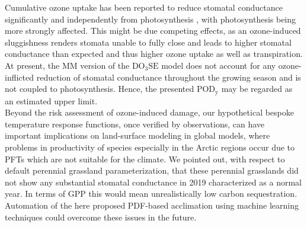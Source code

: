 \documentclass[bg, manuscript]{copernicus}
\begin{document}
Cumulative ozone uptake has been reported to reduce stomatal conductance significantly and independently from photosynthesis \citep[e.g.]{BGS:Lombardozzi2012}, with photosynthesis being more strongly affected. This might be due competing effects, as an ozone-induced sluggishness \citep{SR:Hoshika2015} renders stomata unable to fully close and leads to higher stomatal conductance than expected and thus higher ozone uptake as well as transpiration. At present, the MM version of the $\mathrm{DO_3SE}$ model does not account for any ozone-inflicted reduction of stomatal conductance throughout the growing season and is not coupled to photosynthesis. Hence, the presented $\mathrm{POD_y}$ may be regarded as an estimated upper limit.\\

Beyond the risk assessment of ozone-induced damage, our hypothetical bespoke temperature response functions, once verified by observations, can have important implications on land-surface modeling in global models, where problems in productivity of species especially in the Arctic regions occur due to PFTs which are not suitable for the climate. We pointed out, with respect to default perennial grassland parameterization, that these perennial grasslands did not show any substantial stomatal conductance in 2019 characterized as a normal year. In terms of GPP this would mean unrealistically low carbon sequestration. Automation of the here proposed PDF-based acclimation using machine learning techniques could overcome these issues in the future.









\end{document}
